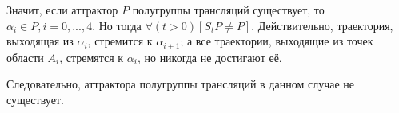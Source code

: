 Значит, если аттрактор $P$ полугруппы трансляций существует, то $\alpha_i \in P, i=0,...,4$.
Но тогда $\forall(t>0)[S_t P \ne P]$.
Действительно, траектория, выходящая из $\alpha_i$, стремится к $\alpha_{i+1}$;
а все траектории, выходящие из точек области $A_i$, стремятся к $\alpha_i$,
но никогда не достигают её.

Следовательно, аттрактора полугруппы трансляций в данном случае не существует.
